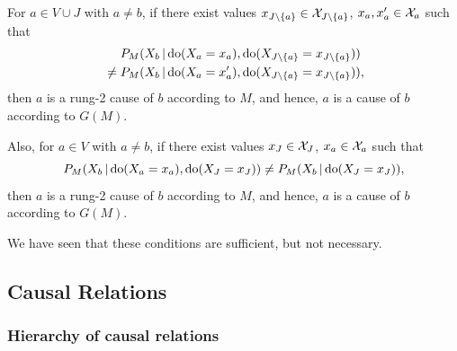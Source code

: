 {\begin{Cor}
  For $a \in V \cup J$ with $a \ne b$, if there exist values $x_{J\setminus\{a\}} \in \mathcal{X}_{J\setminus\{a\}}$, $x_a,x_a' \in \mathcal{X}_a$ such that
    \begin{equation*}\begin{split}
      & P_{M}(X_b \operatorname*{|} \operatorname{do}(X_a=x_a),\operatorname{do}(X_{J\setminus \{a\}}=x_{J\setminus \{a\}})) \\
      {} \ne {} & P_{M}(X_b \operatorname*{|} \operatorname{do}(X_a=x_a'),\operatorname{do}(X_{J\setminus\{a\}}=x_{J\setminus\{a\}})),
    \end{split}\end{equation*}
  then $a$ is a rung-2 cause of $b$ according to $M$, and hence, $a$ is a cause of $b$ according to $G(M)$. %

  Also, for $a \in V$ with $a \ne b$, if there exist values $x_J \in \mathcal{X}_J$, $x_a \in \mathcal{X}_a$ such that
  $$P_{M}(X_b \operatorname*{|} \operatorname{do}(X_a=x_a),\operatorname{do}(X_J=x_J)) \ne P_{M}(X_b \operatorname*{|} \operatorname{do}(X_J=x_J)),$$
  then $a$ is a rung-2 cause of $b$ according to $M$, and hence, $a$ is a cause of $b$ according to $G(M)$.  
\end{Cor}
We have seen that these conditions are sufficient, but not necessary.
}



\subsection{Causal Relations}

\subsubsection{Hierarchy of causal relations}


